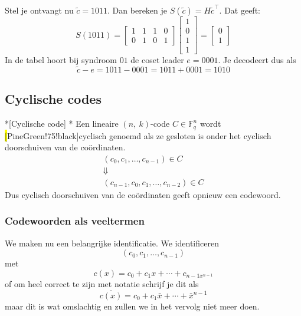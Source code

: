 Stel je ontvangt nu $\tilde{c} = 1011$. Dan bereken je $S(\tilde{c}) = H \tilde{c}^\top$. Dat geeft:
\begin{equation*}
    S(1011) = \begin{bmatrix}
        1 & 1 & 1 & 0 \\
        0 & 1 & 0 & 1
    \end{bmatrix} \begin{bmatrix}
        1 \\ 0 \\ 1 \\ 1
    \end{bmatrix} = \begin{bmatrix}
        0 \\ 1
    \end{bmatrix}
\end{equation*}
In de tabel hoort bij syndroom $01$ de coset leader $e=0001$. Je decodeert dus als
\begin{equation*}
    \tilde{c} - e = 1011 - 0001 = 1011 + 0001 = 1010
\end{equation*}

\subsection{Cyclische codes}

\begin{nicedefinition}*[Cyclische code]
    \nextpart[]*
    Een lineaire $(n,\ k)$-code $C \in \mathbb{F}_q^n$ wordt \hl[PineGreen!75!black]{cyclisch} genoemd als ze gesloten is onder het cyclisch doorschuiven van de coördinaten.
    \begin{equation*}
        \begin{gathered}
            (c_0, c_1, \dots, c_{n-1}) \in C \\
            \Downarrow \\
            (c_{n-1}, c_0, c_1, \dots, c_{n-2}) \in C
        \end{gathered}
    \end{equation*}
    Dus cyclisch doorschuiven van de coördinaten geeft opnieuw een codewoord.
\end{nicedefinition}

\subsubsection{Codewoorden als veeltermen}

We maken nu een belangrijke identificatie. We identificeren
\begin{equation*}
    (c_0, c_1, \dots, c_{n-1})
\end{equation*}
met
\begin{equation*}
    c(x) = c_0 + c_1x + \cdots + c_{n-1x^{n-1}}
\end{equation*}
of om heel correct te zijn met notatie schrijf je dit als
\begin{equation*}
    \overline{c(x)} = c_0 + c_1 \bar{x} + \cdots + \bar{x}^{n-1}
\end{equation*}
maar dit is wat omslachtig en zullen we in het vervolg niet meer doen.

